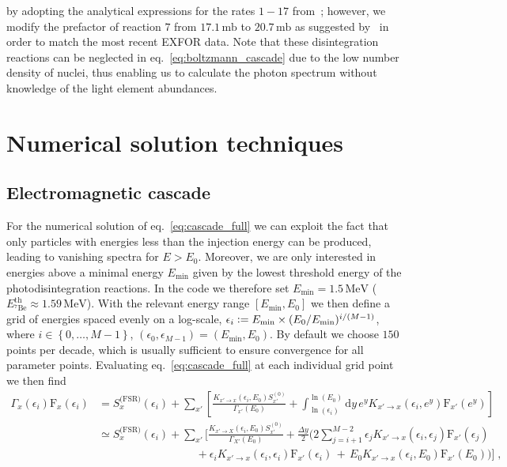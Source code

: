\documentclass[11pt,a4paper]{article}
\newcommand{\Fpdi}{\mathrm{F}}
\newcommand{\eqsp}{\;}
\newcommand{\e}{\,}
\newcommand{\X}{x}
\newcommand{\ldefine}{\vcentcolon=}
\begin{document}
by adopting the analytical expressions for the rates $1-17$ from~\cite{Cyburt:2002uv}; however, we modify the prefactor of reaction $7$ from $17.1\e\mathrm{mb}$ to $20.7\e\mathrm{mb}$ as suggested by~\cite{Jedamzik:2006xz} in order to match the most recent EXFOR data. Note that these disintegration reactions can be neglected in eq.~\eqref{eq:boltzmann_cascade} due to the low number density of nuclei, thus enabling us to calculate the photon spectrum without knowledge of the light element abundances.

\section{Numerical solution techniques}

\subsection{Electromagnetic cascade}
For the numerical solution of eq.~\eqref{eq:cascade_full} we can exploit the fact that only particles with energies less than the injection energy can be produced, leading to vanishing spectra for $E > E_0$. Moreover, we are only interested in energies above a minimal energy $E_\text{min}$ given by the lowest threshold energy of the photodisintegration reactions. In the code we therefore set $E_\text{min} = 1.5\e\mathrm{MeV}$ ($E_{{}^7\mathrm{Be}}^\mathrm{th} \approx 1.59 \, \mathrm{MeV}$). With the relevant energy range $[E_\text{min}, E_0]$ we then define a grid of energies spaced evenly on a log-scale, $\epsilon_i \ldefine E_\text{min} \times (E_0 / E_\text{min})^{i/(M-1)}$, where $i \in \left\{ 0, \dots, M-1 \right\}$, $(\epsilon_0, \epsilon_{M-1}) = (E_\text{min}, E_0)$. By default we choose $150$ points per decade, which is usually sufficient to ensure convergence for all parameter points. Evaluating eq.~\eqref{eq:cascade_full} at each individual grid point we then find~\cite{Hufnagel:2020nxa}
\begin{align}
\Gamma_\X(\epsilon_i) \Fpdi_\X(\epsilon_i)  &= S_\X^{\text{(FSR)}}(\epsilon_i) + \sum_{\X'} \left[ \frac{K_{\X' \to \X} (\epsilon_i, E_0) S_{\X'}^{(0)}}{\Gamma_{\X'} (E_0)} + \int_{\ln(\epsilon_i)}^{\ln(E_0)} \text{d} y \, e^y K_{\X' \to \X} (\epsilon_i, e^y) \Fpdi_{\X'}(e^y)\right] \nonumber \\[4mm]
&\simeq S_\X^{\text{(FSR)}}(\epsilon_i) +  \sum_{\X'} \bigg[ \frac{K_{\X' \to X} (\epsilon_i, E_0) S_{\X'}^{(0)}}{\Gamma_{X'} (E_0)} + \frac{\Delta y}{2} \bigg( 2 \sum_{j=i+1}^{M-2} \epsilon_j K_{\X' \to \X} (\epsilon_i, \epsilon_j) \Fpdi_{\X'}(\epsilon_j)\nonumber\\
&\qquad\quad\qquad\qquad\quad\;\;\; +\epsilon_i K_{\X' \to \X} (\epsilon_i, \epsilon_i) \Fpdi_{\X'}(\epsilon_i)\,  +\,  E_0 K_{\X' \to \X} (\epsilon_i, E_0) \Fpdi_{\X'}(E_0) \bigg) \bigg]\eqsp,
\label{eq:FXi}
\end{align}
\end{document}
